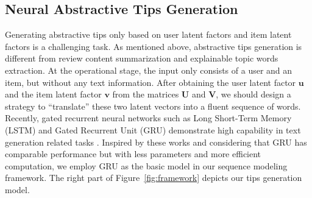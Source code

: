 \documentclass[sigconf]{acmart}
\begin{document}
\subsection{Neural Abstractive Tips Generation}
Generating abstractive tips only based on user latent factors and item latent factors is a challenging task.
As mentioned above, abstractive tips generation is different from review content summarization and explainable topic words extraction.
At the operational stage, the input only consists of a user and an item, but without any text information.
After obtaining the user latent factor $\mathbf{u}$ and the item latent factor $\mathbf{v}$ from the matrices $\mathbf{U}$ and $\mathbf{V}$, we should design a strategy to ``translate'' these two latent vectors into a fluent sequence of words.
Recently, gated recurrent neural networks such as Long Short-Term Memory (LSTM) \cite{hochreiter1997long} and Gated Recurrent Unit (GRU) \cite{cho2014learning} demonstrate high capability in text generation related tasks \cite{bahdanau2014neural,rush2015neural}.
Inspired by these works and considering that GRU has comparable performance but with less parameters and more efficient computation, we employ GRU as the basic model in our sequence modeling framework. The right part of Figure~\ref{fig:framework} depicts our tips generation model.
\end{document}
